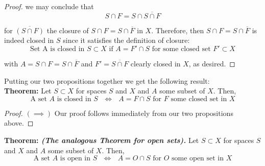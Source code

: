 \documentclass[12pt]{article}
\begin{document}
\begin{proof}
we may conclude that
\begin{equation*}
	S \cap F = S \cap \overline{S \cap F} 
\end{equation*}

for $\overline{\left(S \cap F\right)}$ the closure of $S \cap F = S \cap \overline{F}$ in $X$. Therefore, then $S \cap F = S \cap \overline{F}$ is indeed closed in $S$ since it satisfies the definition of closure:
\begin{equation*}
	\text{Set A is closed in $S \subset X$ if $A = F' \cap S$ for some closed set $F' \subset X$}
\end{equation*} 

with $A = S \cap F = S \cap \overline{F}$ and $F' = \overline{S \cap F}$ clearly closed in $X$, as desired.
\end{proof} \hfill

Putting our two propositions together we get the following result: \\
%
%
{\bf Theorem:} Let $S \subset X$ for spaces $S$ and $X$ and $A$ some subset of $X$. Then,
\begin{equation*}
	\text{A set $A$ is closed in $S$ $\iff$ $A = F \cap S$ for $F$ some closed set in $X$}
\end{equation*} 

\begin{proof} $(\implies)$ Our proof follows immediately from our two propositions above.
\end{proof} \hfill

%
%
{\bf Theorem: {\em (The analogous Theorem for open sets).}} Let $S \subset X$ for spaces $S$ and $X$ and $A$ some subset of $X$. Then,
\begin{equation*}
	\text{A set $A$ is open in $S$ $\iff$ $A = O \cap S$ for $O$ some open set in $X$}
\end{equation*}
\end{document}
